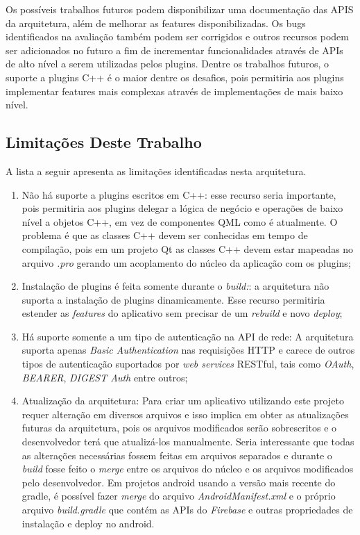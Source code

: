 Os possíveis trabalhos futuros podem disponibilizar uma documentação das APIS da arquitetura, além de melhorar as features disponibilizadas. Os bugs identificados na avaliação também podem ser corrigidos e outros recursos podem ser adicionados no futuro a fim de incrementar funcionalidades através de APIs de alto nível a serem utilizadas pelos plugins. Dentre os trabalhos futuros, o suporte a plugins C++ é o maior dentre os desafios, pois permitiria aos plugins implementar features mais complexas através de implementações de mais baixo nível.

\subsection{Limitações Deste Trabalho}
A lista a seguir apresenta as limitações identificadas nesta arquitetura.

\begin{enumerate}
	\item Não há suporte a plugins escritos em C++: esse recurso seria importante, pois permitiria aos plugins delegar a lógica de negócio e operações de baixo nível a objetos C++, em vez de componentes QML como é atualmente. O problema é que as classes C++ devem ser conhecidas em tempo de compilação, pois em um projeto Qt as classes C++ devem estar mapeadas no arquivo \textit{.pro} gerando um acoplamento do núcleo da aplicação com os plugins;

	\item Instalação de plugins é feita somente durante o \textit{build:}: a arquitetura não suporta a instalação de plugins dinamicamente. Esse recurso permitiria estender as \textit{features} do aplicativo sem precisar de um \textit{rebuild} e novo \textit{deploy};

	\item Há suporte somente a um tipo de autenticação na API de rede: A arquitetura suporta apenas \textit{Basic Authentication} nas requisições HTTP e carece de outros tipos de autenticação suportados por \textit{web services} RESTful, tais como \textit{OAuth}, \textit{BEARER}, \textit{DIGEST Auth} entre outros;

	\item Atualização da arquitetura: Para criar um aplicativo utilizando este projeto requer alteração em diversos arquivos e isso implica em obter as atualizações futuras da arquitetura, pois os arquivos modificados serão sobrescritos e o desenvolvedor terá que atualizá-los manualmente. Seria interessante que todas as alterações necessárias fossem feitas em arquivos separados e durante o \textit{build} fosse feito o \textit{merge} entre os arquivos do núcleo e os arquivos modificados pelo desenvolvedor. Em projetos android usando a versão mais recente do gradle, é possível fazer \textit{merge} do arquivo \textit{AndroidManifest.xml} e o próprio arquivo \textit{build.gradle} que contém as APIs do \textit{Firebase} e outras propriedades de instalação e deploy no android.
\end{enumerate}



